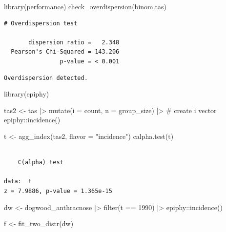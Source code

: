 \documentclass[
  letterpaper,
  DIV=11,
  numbers=noendperiod]{scrreprt}
\newenvironment{Shaded}{\begin{snugshade}}{\end{snugshade}}
\newcommand{\AttributeTok}[1]{\textcolor[rgb]{0.40,0.45,0.13}{#1}}
\newcommand{\CommentTok}[1]{\textcolor[rgb]{0.37,0.37,0.37}{#1}}
\newcommand{\DecValTok}[1]{\textcolor[rgb]{0.68,0.00,0.00}{#1}}
\newcommand{\FunctionTok}[1]{\textcolor[rgb]{0.28,0.35,0.67}{#1}}
\newcommand{\NormalTok}[1]{\textcolor[rgb]{0.00,0.23,0.31}{#1}}
\newcommand{\OtherTok}[1]{\textcolor[rgb]{0.00,0.23,0.31}{#1}}
\newcommand{\SpecialCharTok}[1]{\textcolor[rgb]{0.37,0.37,0.37}{#1}}
\newcommand{\StringTok}[1]{\textcolor[rgb]{0.13,0.47,0.30}{#1}}
\begin{document}
\begin{Shaded}
\begin{Highlighting}[]
\FunctionTok{library}\NormalTok{(performance)}
\FunctionTok{check\_overdispersion}\NormalTok{(binom.tas)}
\end{Highlighting}
\end{Shaded}

\begin{verbatim}
# Overdispersion test

       dispersion ratio =   2.348
  Pearson's Chi-Squared = 143.206
                p-value = < 0.001
\end{verbatim}

\begin{verbatim}
Overdispersion detected.
\end{verbatim}

\begin{Shaded}
\begin{Highlighting}[]
\FunctionTok{library}\NormalTok{(epiphy)}

\NormalTok{tas2 }\OtherTok{\textless{}{-}}\NormalTok{ tas }\SpecialCharTok{|\textgreater{}}
  \FunctionTok{mutate}\NormalTok{(}\AttributeTok{i =}\NormalTok{ count,}
         \AttributeTok{n =}\NormalTok{ group\_size) }\SpecialCharTok{|\textgreater{}}  \CommentTok{\# create i vector}
\NormalTok{  epiphy}\SpecialCharTok{::}\FunctionTok{incidence}\NormalTok{()}

\NormalTok{t }\OtherTok{\textless{}{-}} \FunctionTok{agg\_index}\NormalTok{(tas2, }\AttributeTok{flavor =} \StringTok{"incidence"}\NormalTok{)}
\FunctionTok{calpha.test}\NormalTok{(t)}
\end{Highlighting}
\end{Shaded}

\begin{verbatim}

    C(alpha) test

data:  t
z = 7.9886, p-value = 1.365e-15
\end{verbatim}

\begin{Shaded}
\begin{Highlighting}[]
\NormalTok{dw }\OtherTok{\textless{}{-}}\NormalTok{ dogwood\_anthracnose }\SpecialCharTok{|\textgreater{}} 
  \FunctionTok{filter}\NormalTok{(t }\SpecialCharTok{==} \DecValTok{1990}\NormalTok{) }\SpecialCharTok{|\textgreater{}} 
\NormalTok{  epiphy}\SpecialCharTok{::}\FunctionTok{incidence}\NormalTok{()}

\NormalTok{f }\OtherTok{\textless{}{-}} \FunctionTok{fit\_two\_distr}\NormalTok{(dw)}
\end{Highlighting}
\end{Shaded}
\end{document}
